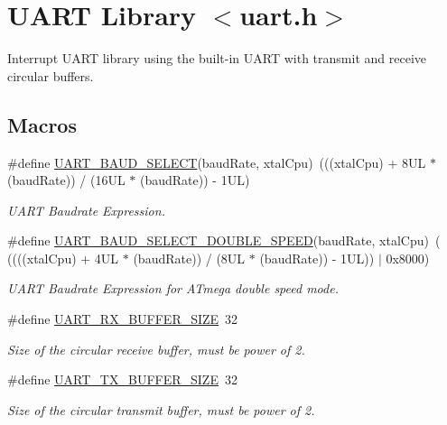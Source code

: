 \hypertarget{group__pfleury__uart}{}\section{U\+A\+RT Library $<$uart.\+h$>$}
\label{group__pfleury__uart}


Interrupt U\+A\+RT library using the built-\/in U\+A\+RT with transmit and receive circular buffers.  


\subsection*{Macros}
\begin{DoxyCompactItemize}
\item 
\#define \hyperlink{group__pfleury__uart_ga367ff7b5de225ed936a63239ad4adb0b}{U\+A\+R\+T\+\_\+\+B\+A\+U\+D\+\_\+\+S\+E\+L\+E\+CT}(baud\+Rate,  xtal\+Cpu)~(((xtal\+Cpu) + 8\+U\+L $\ast$ (baud\+Rate)) / (16\+U\+L $\ast$ (baud\+Rate)) -\/ 1\+U\+L)
\begin{DoxyCompactList}\small\item\em U\+A\+RT Baudrate Expression. \end{DoxyCompactList}\item 
\#define \hyperlink{group__pfleury__uart_ga1a02d45130520cb651ab313e69039382}{U\+A\+R\+T\+\_\+\+B\+A\+U\+D\+\_\+\+S\+E\+L\+E\+C\+T\+\_\+\+D\+O\+U\+B\+L\+E\+\_\+\+S\+P\+E\+ED}(baud\+Rate,  xtal\+Cpu)~( ((((xtal\+Cpu) + 4\+U\+L $\ast$ (baud\+Rate)) / (8\+U\+L $\ast$ (baud\+Rate)) -\/ 1\+U\+L)) $\vert$ 0x8000)
\begin{DoxyCompactList}\small\item\em U\+A\+RT Baudrate Expression for A\+Tmega double speed mode. \end{DoxyCompactList}\item 
\#define \hyperlink{group__pfleury__uart_ga5bdd6772c246436bb14377095de79b31}{U\+A\+R\+T\+\_\+\+R\+X\+\_\+\+B\+U\+F\+F\+E\+R\+\_\+\+S\+I\+ZE}~32
\begin{DoxyCompactList}\small\item\em Size of the circular receive buffer, must be power of 2. \end{DoxyCompactList}\item 
\#define \hyperlink{group__pfleury__uart_ga05f5d709605c6317c97e4974bec3402a}{U\+A\+R\+T\+\_\+\+T\+X\+\_\+\+B\+U\+F\+F\+E\+R\+\_\+\+S\+I\+ZE}~32
\begin{DoxyCompactList}\small\item\em Size of the circular transmit buffer, must be power of 2. \end{DoxyCompactList}\item 

\end{DoxyCompactItemize}
